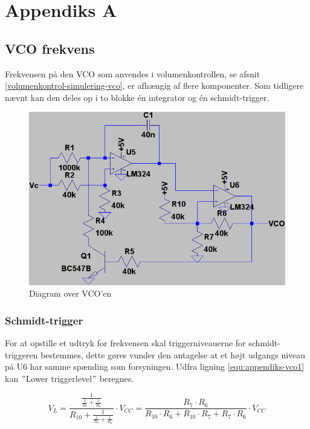 \chapter{Appendiks A}
\label{vco-frekvens}
\section*{VCO frekvens}

Frekvensen på den VCO som anvendes i volumenkontrollen, se afsnit \ref{volumenkontrol-simulering-vco}, er afhængig af flere komponenter. Som tidligere nævnt kan den deles op i to blokke én integrator og én schmidt-trigger. 

\begin{figure}[h]
\centering
\includegraphics[width=\textwidth]{teknisk/volumenkontrol/vco.png}
\caption{Diagram over VCO'en}
\label{fig:appendiks-vco}
\end{figure}

\subsection*{Schmidt-trigger}

For at opstille et udtryk for frekvensen skal triggerniveauerne for schmidt-triggeren bestemmes, dette gøres vunder den antagelse at et højt udgangs niveau på U6 har samme spænding som forsyningen. Udfra ligning \ref{equ:appendiks-vco1} kan $"$Lower triggerlevel$"$ beregnes.

\begin{equation}
\label{equ:appendiks-vco1}
V_L = \frac{\frac{1}{\frac{1}{R_7} + \frac{1}{R_6}}}{R_{10} + \frac{1}{\frac{1}{R_7} + \frac{1}{R_6}}} \cdot V_{CC} = \frac{R_7 \cdot R_6}{R_{10} \cdot R_6 + R_{10} \cdot R_7 + R_7 \cdot R_6} \cdot V_{CC}
\end{equation}

